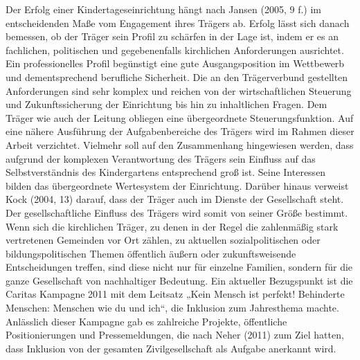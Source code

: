 Der Erfolg einer Kindertageseinrichtung hängt nach Jansen (2005, 9 f.) im entscheidenden Maße vom Engagement ihres Trägers ab. Erfolg lässt sich danach bemessen, ob der Träger sein Profil zu schärfen in der Lage ist, indem er es an fachlichen, politischen und gegebenenfalls kirchlichen Anforderungen ausrichtet. Ein professionelles Profil begünstigt eine gute Ausgangsposition im Wettbewerb und dementsprechend berufliche Sicherheit. Die an den Trägerverbund gestellten Anforderungen sind sehr komplex und reichen von der wirtschaftlichen Steuerung und Zukunftssicherung der Einrichtung bis hin zu inhaltlichen Fragen. Dem Träger wie auch der Leitung obliegen eine übergeordnete Steuerungsfunktion. Auf eine nähere Ausführung der Aufgabenbereiche des Trägers wird im Rahmen dieser Arbeit verzichtet. Vielmehr soll auf den Zusammenhang hingewiesen werden, dass aufgrund der komplexen Verantwortung des Trägers sein Einfluss auf das Selbstverständnis des Kindergartens entsprechend groß ist. Seine Interessen bilden das übergeordnete Wertesystem der Einrichtung. Darüber hinaus verweist Kock (2004, 13) darauf, dass der Träger auch im Dienste der Gesellschaft steht. Der gesellschaftliche Einfluss des Trägers wird somit von seiner Größe bestimmt. Wenn sich die kirchlichen Träger, zu denen in der Regel die zahlenmäßig stark vertretenen Gemeinden vor Ort zählen, zu aktuellen sozialpolitischen oder bildungspolitischen Themen öffentlich äußern oder zukunftsweisende Entscheidungen treffen, sind diese nicht nur für einzelne Familien, sondern für die ganze Gesellschaft von nachhaltiger Bedeutung. Ein aktueller Bezugspunkt ist die Caritas Kampagne 2011 mit dem Leitsatz „Kein Mensch ist perfekt! Behinderte Menschen: Menschen wie du und ich“, die Inklusion zum Jahresthema machte. Anlässlich dieser Kampagne gab es zahlreiche Projekte, öffentliche Positionierungen und Pressemeldungen, die nach Neher (2011) zum Ziel hatten, dass Inklusion von der gesamten Zivilgesellschaft als Aufgabe anerkannt wird.
   
